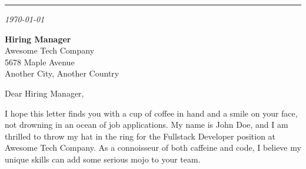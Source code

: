 \newpage

\begin{minipage}[t][\textheight-1em]{\textwidth}
	\vspace{0pt}

	\noindent{}
	\vspace{0.3em}
	\par\vspace{-1em}\noindent\rule{\linewidth}{0.3mm}\par

	\vspace{2em}
    
    \textit{\today}

    \vspace{2em}

	\textbf{Hiring Manager}\\
	Awesome Tech Company\\
	5678 Maple Avenue\\
	Another City, Another Country\\

	\vspace{2em}

	Dear Hiring Manager,

    \vspace{1em}

	I hope this letter finds you with a cup of coffee in hand and a smile on your face, not drowning in an ocean of job applications. My name is John Doe, and I am thrilled to throw my hat in the ring for the Fullstack Developer position at Awesome Tech Company. As a connoisseur of both caffeine and code, I believe my unique skills can add some serious mojo to your team.

    \vspace{1em}


\end{minipage}
